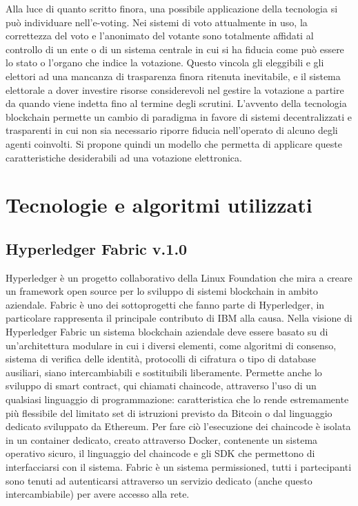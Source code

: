 Alla luce di quanto scritto finora, una possibile applicazione della tecnologia si può individuare nell'e-voting. Nei sistemi di voto attualmente in uso, la correttezza del voto e l’anonimato del votante sono totalmente affidati al controllo di un ente o di un sistema centrale in cui si ha fiducia come può essere lo stato o l'organo che indice la votazione. Questo vincola gli eleggibili e gli elettori ad una mancanza di trasparenza finora ritenuta inevitabile, e il sistema elettorale a dover investire risorse considerevoli nel gestire la votazione a partire da quando viene indetta fino al termine degli scrutini. L’avvento della tecnologia blockchain permette un cambio di paradigma in favore di sistemi decentralizzati e trasparenti in cui non sia necessario riporre fiducia nell’operato di alcuno degli agenti coinvolti. Si propone quindi un modello che permetta di applicare queste caratteristiche desiderabili ad una votazione elettronica.

\section{Tecnologie e algoritmi utilizzati}
	\subsection{Hyperledger Fabric v.1.0} \label{sec:Hyperledger}
		Hyperledger è un progetto collaborativo della Linux Foundation che mira a creare un framework open source per lo sviluppo di sistemi blockchain in ambito aziendale. Fabric è uno dei sottoprogetti che fanno parte di Hyperledger, in particolare rappresenta il principale contributo di IBM alla causa. Nella visione di Hyperledger Fabric un sistema blockchain aziendale deve essere basato su di un'architettura modulare in cui i diversi elementi, come algoritmi di consenso, sistema di verifica delle identità, protocolli di cifratura o tipo di database ausiliari, siano intercambiabili e sostituibili liberamente. Permette anche lo sviluppo di smart contract, qui chiamati chaincode, attraverso l'uso di un qualsiasi linguaggio di programmazione: caratteristica che lo rende estremamente più flessibile del limitato set di istruzioni previsto da Bitcoin o dal linguaggio dedicato sviluppato da Ethereum. Per fare ciò l'esecuzione dei chaincode è isolata in un container dedicato, creato attraverso Docker, contenente un sistema operativo sicuro, il linguaggio del chaincode e gli SDK che permettono di interfacciarsi con il sistema. Fabric è un sistema permissioned, tutti i partecipanti sono tenuti ad autenticarsi attraverso un servizio dedicato (anche questo intercambiabile) per avere accesso alla rete. 
